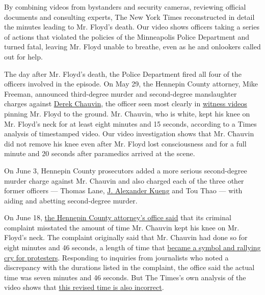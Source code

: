 By combining videos from bystanders and security cameras, reviewing
official documents and consulting experts, The New York Times
reconstructed in detail the minutes leading to Mr. Floyd's death. Our
video shows officers taking a series of actions that violated the
policies of the Minneapolis Police Department and turned fatal, leaving
Mr. Floyd unable to breathe, even as he and onlookers called out for
help.

The day after Mr. Floyd's death, the Police Department fired all four of
the officers involved in the episode. On May 29, the Hennepin County
attorney, Mike Freeman, announced third-degree murder and second-degree
manslaughter charges against
\href{https://www.nytimes.com/2020/07/22/us/derek-chauvin-tax-fraud.html}{Derek
Chauvin}, the officer seen most clearly in
\href{https://www.nytimes.com/2020/06/04/us/politics/george-floyd-witness-maurice-lester-hall.html}{witness
videos} pinning Mr. Floyd to the ground. Mr. Chauvin, who is white, kept
his knee on Mr. Floyd's neck for at least eight minutes and 15 seconds,
according to a Times analysis of timestamped video. Our video
investigation shows that Mr. Chauvin did not remove his knee even after
Mr. Floyd lost consciousness and for a full minute and 20 seconds after
paramedics arrived at the scene.

On June 3, Hennepin County prosecutors added a more serious
second-degree murder charge against Mr. Chauvin and also charged each of
the three other former officers --- Thomas Lane,
\href{https://www.nytimes.com/2020/06/27/us/minneapolis-police-officer-kueng.html}{J.
Alexander Kueng} and Tou Thao --- with aiding and abetting second-degree
murder.

On June 18,
\href{https://m.startribune.com/7-minutes-46-seconds-county-says-error-in-timeline-of-floyd-s-killing-won-t-affect-charges/571322872/}{the
Hennepin County attorney's office said} that its criminal complaint
misstated the amount of time Mr. Chauvin kept his knee on Mr. Floyd's
neck. The complaint originally said that Mr. Chauvin had done so for
eight minutes and 46 seconds, a length of time that
\href{https://www.nytimes.com/2020/06/18/us/george-floyd-timing.html}{became
a symbol and rallying cry for protesters}. Responding to inquiries from
journalists who noted a discrepancy with the durations listed in the
complaint, the office said the actual time was seven minutes and 46
seconds. But The Times's own analysis of the video shows that
\href{https://www.nytimes.com/2020/06/18/us/george-floyd-timing.html}{this
revised time is also incorrect}.

